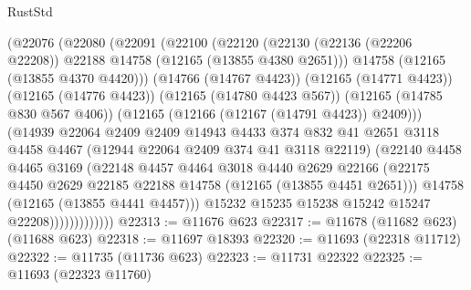 \begin{lexlean}{RustStd}
\begin{coremodule}
                    (@22076
                      (@22080
                        (@22091
                          (@22100
                            (@22120
                              (@22130
                                (@22136 (@22206 @22208))
                                @22188
                                @14758
                                (@12165 (@13855 @4380 @2651)))
                              @14758
                              (@12165 (@13855 @4370 @4420)))
                            (@14766 (@14767 @4423))
                            (@12165 (@14771 @4423))
                            (@12165 (@14776 @4423))
                            (@12165 (@14780 @4423 @567))
                            (@12165 (@14785 @830 @567 @406))
                            (@12165 (@12166 (@12167 (@14791 @4423)) @2409)))
                          (@14939
                            @22064
                            @2409
                            @2409
                            @14943
                            @4433
                            @374
                            @832
                            @41
                            @2651
                            @3118
                            @4458
                            @4467
                            (@12944 @22064 @2409 @374 @41 @3118 @22119)
                            (@22140
                              @4458
                              @4465
                              @3169
                              (@22148
                                @4457
                                @4464
                                @3018
                                @4440
                                @2629
                                @22166
                                (@22175
                                  @4450
                                  @2629
                                  @22185
                                  @22188
                                  @14758
                                  (@12165 (@13855 @4451 @2651)))
                                @14758
                                (@12165 (@13855 @4441 @4457)))
                              @15232
                              @15235
                              @15238
                              @15242
                              @15247
                              @22208)))))))))))))
@22313 := @11676 @623
@22317 := @11678 (@11682 @623) (@11688 @623)
@22318 := @11697 @18393
@22320 := @11693 (@22318 @11712)
@22322 := @11735 (@11736 @623)
@22323 := @11731 @22322
@22325 := @11693 (@22323 @11760)

\end{coremodule}
\end{lexlean}

